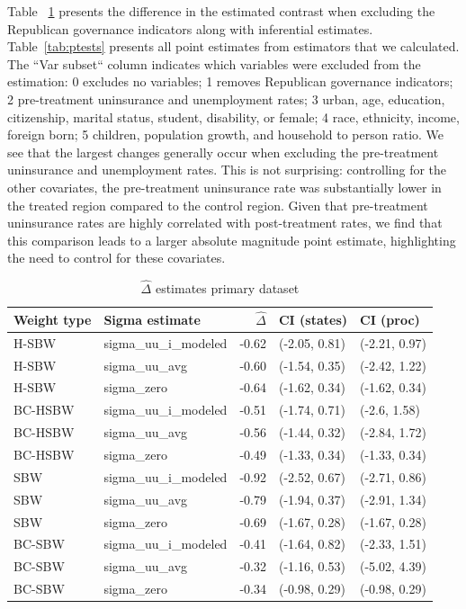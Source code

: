 \documentclass[12pt]{article}
\begin{document}
Table ~\ref{tab:deltac1} presents the difference in the estimated contrast when excluding the Republican governance indicators along with inferential estimates. Table~\ref{tab:ptests} presents all point estimates from estimators that we calculated. The ``Var subset`` column indicates which variables were excluded from the estimation: 0 excludes no variables; 1 removes Republican governance indicators; 2 pre-treatment uninsurance and unemployment rates; 3 urban, age, education, citizenship, marital status, student, disability, or female; 4 race, ethnicity, income, foreign born; 5 children, population growth, and household to person ratio. We see that the largest changes generally occur when excluding the pre-treatment uninsurance and unemployment rates. This is not surprising: controlling for the other covariates, the pre-treatment uninsurance rate was substantially lower in the treated region compared to the control region. Given that pre-treatment uninsurance rates are highly correlated with post-treatment rates, we find that this comparison leads to a larger absolute magnitude point estimate, highlighting the need to control for these covariates.

\begin{table}[ht]
\centering
\begin{tabular}{llrll}
  \toprule
Weight type & Sigma estimate & $\hat{\Delta}$ & CI (states) & CI (proc) \\ 
  \midrule
H-SBW & sigma\_uu\_i\_modeled & -0.62 & (-2.05, 0.81) & (-2.21, 0.97) \\ 
  H-SBW & sigma\_uu\_avg & -0.60 & (-1.54, 0.35) & (-2.42, 1.22) \\ 
  H-SBW & sigma\_zero & -0.64 & (-1.62, 0.34) & (-1.62, 0.34) \\ 
  BC-HSBW & sigma\_uu\_i\_modeled & -0.51 & (-1.74, 0.71) & (-2.6, 1.58) \\ 
  BC-HSBW & sigma\_uu\_avg & -0.56 & (-1.44, 0.32) & (-2.84, 1.72) \\ 
  BC-HSBW & sigma\_zero & -0.49 & (-1.33, 0.34) & (-1.33, 0.34) \\ 
  SBW & sigma\_uu\_i\_modeled & -0.92 & (-2.52, 0.67) & (-2.71, 0.86) \\ 
  SBW & sigma\_uu\_avg & -0.79 & (-1.94, 0.37) & (-2.91, 1.34) \\ 
  SBW & sigma\_zero & -0.69 & (-1.67, 0.28) & (-1.67, 0.28) \\ 
  BC-SBW & sigma\_uu\_i\_modeled & -0.41 & (-1.64, 0.82) & (-2.33, 1.51) \\ 
  BC-SBW & sigma\_uu\_avg & -0.32 & (-1.16, 0.53) & (-5.02, 4.39) \\ 
  BC-SBW & sigma\_zero & -0.34 & (-0.98, 0.29) & (-0.98, 0.29) \\ 
   \bottomrule
\end{tabular}
\caption{$\hat{\Delta}$ estimates primary dataset}
\label{tab:deltac1}
\end{table}
\end{document}

